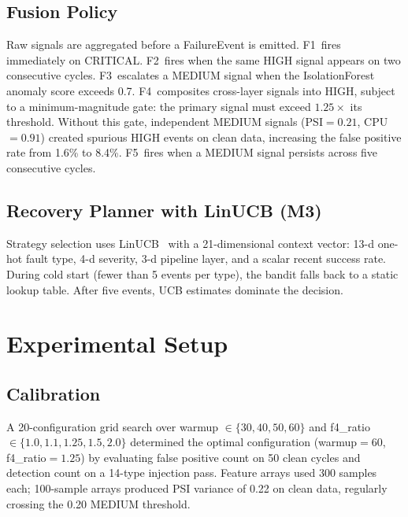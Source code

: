 \documentclass[conference]{IEEEtran}
\begin{document}
\subsection{Fusion Policy}

Raw signals are aggregated before a FailureEvent is emitted. F1~fires
immediately on CRITICAL. F2~fires when the same HIGH signal appears on two
consecutive cycles. F3~escalates a MEDIUM signal when the IsolationForest
anomaly score exceeds 0.7. F4~composites cross-layer signals into HIGH,
subject to a minimum-magnitude gate: the primary signal must exceed $1.25\times$
its threshold. Without this gate, independent MEDIUM signals (PSI$=0.21$,
CPU$=0.91$) created spurious HIGH events on clean data, increasing the false
positive rate from 1.6\% to 8.4\%. F5~fires when a MEDIUM signal persists
across five consecutive cycles.

\subsection{Recovery Planner with LinUCB (M3)}

Strategy selection uses LinUCB~\cite{linucb} with a 21-dimensional context
vector: 13-d one-hot fault type, 4-d severity, 3-d pipeline layer, and a
scalar recent success rate. During cold start (fewer than 5 events per type),
the bandit falls back to a static lookup table. After five events, UCB
estimates dominate the decision.

\section{Experimental Setup}

\subsection{Calibration}

A 20-configuration grid search over warmup $\in \{30,40,50,60\}$ and
f4\_ratio $\in \{1.0,1.1,1.25,1.5,2.0\}$ determined the optimal configuration
(warmup$=60$, f4\_ratio$=1.25$) by evaluating false positive count on 50 clean
cycles and detection count on a 14-type injection pass. Feature arrays used
300 samples each; 100-sample arrays produced PSI variance of 0.22 on clean
data, regularly crossing the 0.20 MEDIUM threshold.
\end{document}
